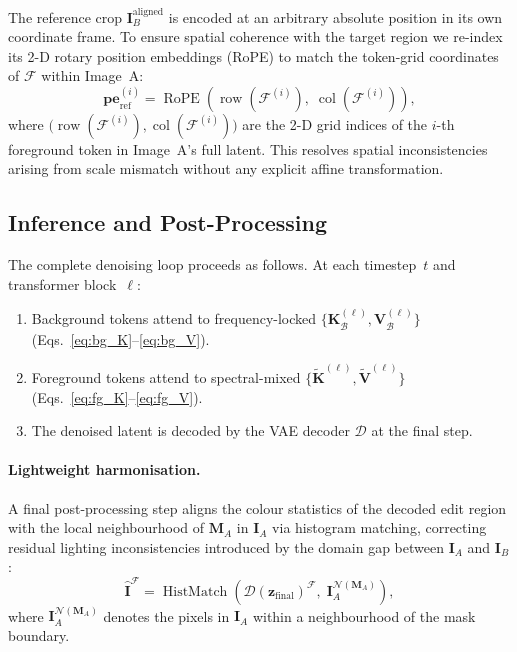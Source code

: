 The reference crop $\mathbf{I}_B^{\text{aligned}}$ is encoded at an arbitrary absolute
position in its own coordinate frame.
To ensure spatial coherence with the target region we re-index its 2-D rotary position
embeddings (RoPE) to match the token-grid coordinates of $\mathcal{F}$ within Image~A:
\begin{equation}
    \mathbf{pe}_{\text{ref}}^{(i)}
        = \operatorname{RoPE}\!\left(
              \operatorname{row}\!\left(\mathcal{F}^{(i)}\right),\;
              \operatorname{col}\!\left(\mathcal{F}^{(i)}\right)
          \right),
    \label{eq:rope}
\end{equation}
where $\bigl(\operatorname{row}(\mathcal{F}^{(i)}), \operatorname{col}(\mathcal{F}^{(i)})\bigr)$
are the 2-D grid indices of the $i$-th foreground token in Image~A's full latent.
This resolves spatial inconsistencies arising from scale mismatch without any explicit affine
transformation.

\subsection{Inference and Post-Processing}

The complete denoising loop proceeds as follows.
At each timestep~$t$ and transformer block~$\ell$:
\begin{enumerate}
    \item Background tokens attend to frequency-locked
          $\{\mathbf{K}_{\mathcal{B}}^{(\ell)}, \mathbf{V}_{\mathcal{B}}^{(\ell)}\}$
          (Eqs.~\eqref{eq:bg_K}--\eqref{eq:bg_V}).
    \item Foreground tokens attend to spectral-mixed
          $\{\tilde{\mathbf{K}}^{(\ell)}, \tilde{\mathbf{V}}^{(\ell)}\}$
          (Eqs.~\eqref{eq:fg_K}--\eqref{eq:fg_V}).
    \item The denoised latent is decoded by the VAE decoder $\mathcal{D}$ at the final step.
\end{enumerate}

\paragraph{Lightweight harmonisation.}
A final post-processing step aligns the colour statistics of the decoded edit region with the
local neighbourhood of $\mathbf{M}_A$ in $\mathbf{I}_A$ via histogram matching, correcting
residual lighting inconsistencies introduced by the domain gap between
$\mathbf{I}_A$ and $\mathbf{I}_B$:
\begin{equation}
    \hat{\mathbf{I}}^{\mathcal{F}}
        = \operatorname{HistMatch}\!\left(
              \mathcal{D}(\mathbf{z}_{\text{final}})^{\mathcal{F}},\;
              \mathbf{I}_A^{\mathcal{N}(\mathbf{M}_A)}
          \right),
    \label{eq:histmatch}
\end{equation}
where $\mathbf{I}_A^{\mathcal{N}(\mathbf{M}_A)}$ denotes the pixels in $\mathbf{I}_A$
within a neighbourhood of the mask boundary.

